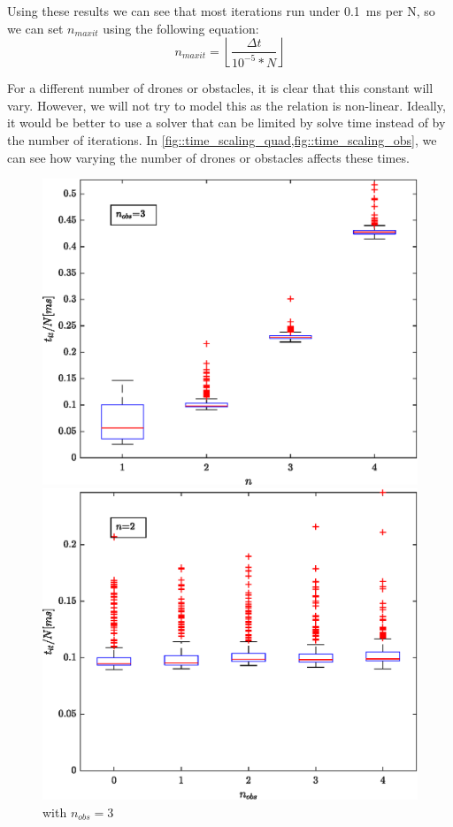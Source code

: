 Using these results we can see that most iterations run under \SI{.1}{\milli\second} per N, so we can set $n_{maxit}$ using the following equation:
\begin{equation}
\label{eq::maxit}
n_{maxit}=\left\lfloor\frac{\Delta t}{10^{-5}*N}\right\rfloor
\end{equation}

For a different number of drones or obstacles, it is clear that this constant will vary. However, we will not try to model this as the relation is non-linear. Ideally, it would be better to use a solver that can be limited by solve time instead of by the number of iterations. In \cref{fig::time_scaling_quad,fig::time_scaling_obs}, we can see how varying the number of drones or obstacles affects these times. 

\begin{figure}
	\centering
	\begin{minipage}{.5\textwidth}
		\centering
		\includegraphics[width=.9\linewidth]{Figures/time_scaling_quad}
		\caption[Scaling of $t_{it}/N$ when varying $n$]{ with $n_{obs}=3$}
		\label{fig::time_scaling_quad}
	\end{minipage}%
	\begin{minipage}{.5\textwidth}
		\centering
		\includegraphics[width=.9\linewidth]{Figures/time_scaling_obs}

\end{minipage}
\end{figure}
